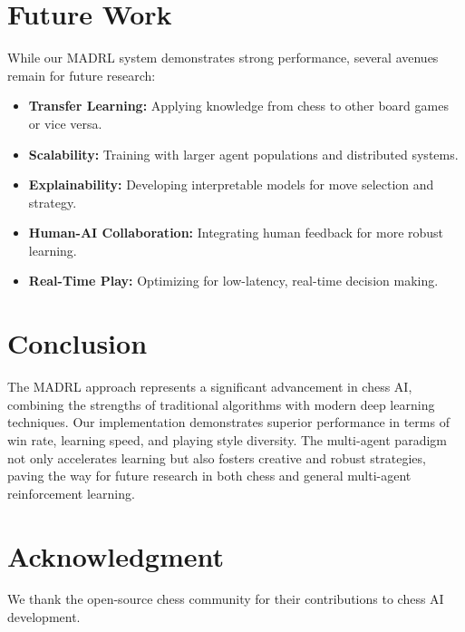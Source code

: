 \documentclass[conference]{IEEEtran}
\begin{document}
\section{Future Work}
While our MADRL system demonstrates strong performance, several avenues remain for future research:
\begin{itemize}
    \item \textbf{Transfer Learning:} Applying knowledge from chess to other board games or vice versa.
    \item \textbf{Scalability:} Training with larger agent populations and distributed systems.
    \item \textbf{Explainability:} Developing interpretable models for move selection and strategy.
    \item \textbf{Human-AI Collaboration:} Integrating human feedback for more robust learning.
    \item \textbf{Real-Time Play:} Optimizing for low-latency, real-time decision making.
\end{itemize}

\section{Conclusion}
The MADRL approach represents a significant advancement in chess AI, combining the strengths of traditional algorithms with modern deep learning techniques. Our implementation demonstrates superior performance in terms of win rate, learning speed, and playing style diversity. The multi-agent paradigm not only accelerates learning but also fosters creative and robust strategies, paving the way for future research in both chess and general multi-agent reinforcement learning.

\section*{Acknowledgment}
We thank the open-source chess community for their contributions to chess AI development.
\end{document}
